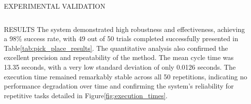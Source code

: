 \documentclass[%
  final,%
  english,%
  english,%
]{beamer}
\begin{document}
\begin{frame}[t, fragile = singleslide]
\begin{columns}[t, onlytextwidth]
\begin{column}{0.49\textwidth}
\begin{block}{EXPERIMENTAL VALIDATION}
\end{block}
%
\end{column}
%
\end{columns}

\begin{columns}[t, onlytextwidth]
%
\begin{column}{\textwidth}
%
\begin{block}{RESULTS}
The system demonstrated high robustness and effectiveness, achieving a 98\% success rate, with 49 out of 50 trials completed successfully presented in Table\ref{tab:pick_place_results}. The quantitative analysis also confirmed the excellent precision and repeatability of the method. The mean cycle time was 13.35 seconds, with a very low standard deviation of only 0.0126 seconds. The execution time remained remarkably stable across all 50 repetitions, indicating no performance degradation over time and confirming the system's reliability for repetitive tasks detailed in Figure\ref{fig:execution_times}.



\end{block}
\end{column}
\end{columns}
\end{frame}
\end{document}
